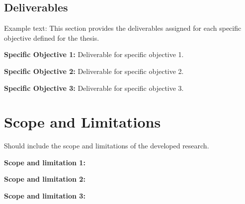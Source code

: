 \subsection{Deliverables}
Example text:
This section provides the deliverables assigned for each specific objective defined for the thesis.

\textbf{Specific Objective 1:}
Deliverable for specific objective 1. 

\textbf{Specific Objective 2:}
Deliverable for specific objective 2.

\textbf{Specific Objective 3:}
Deliverable for specific objective 3.

\section{Scope and Limitations}

Should include the scope and limitations of the developed research.

\textbf{Scope and limitation 1:} 

\textbf{Scope and limitation 2:}
 
\textbf{Scope and limitation 3:} 